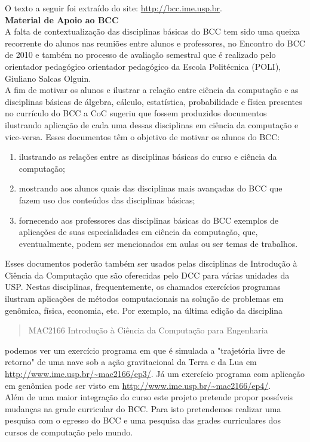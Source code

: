 O texto a seguir foi extraído do site: \url{http://bcc.ime.usp.br}. \\

{\large \textbf{Material de Apoio ao BCC}} \\

A falta de contextualização das disciplinas básicas do BCC tem sido uma queixa recorrente do alunos nas reuniões entre alunos e professores, no Encontro do BCC de 2010 e também no processo de avaliação semestral que é realizado pelo orientador pedagógico orientador pedagógico da Escola Politécnica (POLI), Giuliano Salcas Olguin.\\

A fim de motivar os alunos e ilustrar a relação entre ciência da computação e as disciplinas básicas de álgebra, cálculo, estatística, probabilidade e física presentes no currículo do BCC a CoC sugeriu que fossem produzidos documentos ilustrando aplicação de cada uma dessas disciplinas em ciência da computação e vice-versa.  Esses documentos têm o objetivo de motivar os alunos do BCC:

\begin{enumerate}
\item ilustrando as relações entre as disciplinas básicas do curso e ciência da computação;
\item mostrando aos alunos quais das disciplinas mais avançadas do BCC que fazem uso dos conteúdos das disciplinas básicas;
\item fornecendo aos professores das disciplinas básicas do BCC exemplos de aplicações de suas especialidades em ciência da computação, que, eventualmente, podem ser mencionados em aulas ou ser temas de trabalhos.
\end{enumerate}

Esses documentos poderão também ser usados pelas disciplinas de Introdução à Ciência da Computação que são oferecidas pelo DCC para várias unidades da USP. Nestas disciplinas, frequentemente, os chamados exercícios programas ilustram aplicações de métodos computacionais na solução de problemas em genômica, física, economia, etc.
Por exemplo, na última edição da disciplina \begin{quote} MAC2166 Introdução à Ciência da Computação para Engenharia \end{quote}
podemos ver um exercício programa em que é simulada a "trajetória livre de retorno" de uma nave sob a ação gravitacional da Terra e da Lua em \url{http://www.ime.usp.br/~mac2166/ep3/}. Já um exercício programa com aplicação em genômica pode ser visto em \url{http://www.ime.usp.br/~mac2166/ep4/}.\\

Além de uma maior integração do curso este projeto pretende propor possíveis mudanças na grade curricular do BCC. Para isto pretendemos realizar uma pesquisa com o egresso do BCC e uma pesquisa das grades curriculares dos cursos de computação pelo mundo.
